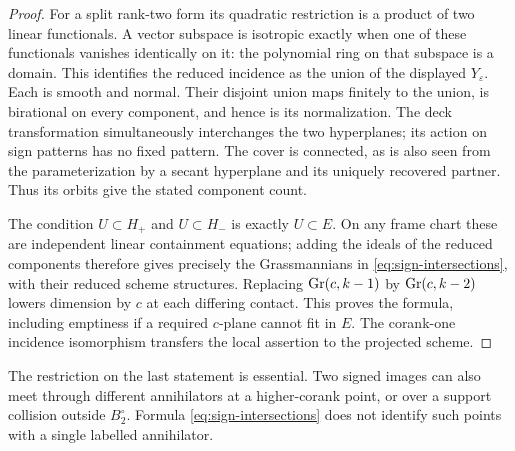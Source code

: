 \begin{proof}
For a split rank-two form its quadratic restriction is a product of two
linear functionals. A vector subspace is isotropic exactly when one of
these functionals vanishes identically on it: the polynomial ring on
that subspace is a domain. This identifies the reduced incidence as the
union of the displayed $Y_\varepsilon$. Each is smooth and normal.
Their disjoint union maps finitely to the union, is birational on every
component, and hence is its normalization. The deck transformation
simultaneously interchanges the two hyperplanes; its action on sign
patterns has no fixed pattern. The cover is connected, as is also seen
from the parameterization by a secant hyperplane and its uniquely
recovered partner. Thus its orbits give the stated component count.

The condition $U\subset H_+$ and $U\subset H_-$ is exactly
$U\subset E$. On any frame chart these are independent linear
containment equations; adding the ideals of the reduced components
therefore gives precisely the Grassmannians in
\eqref{eq:sign-intersections}, with their reduced scheme structures.
Replacing $\operatorname{Gr}(c,k-1)$ by $\operatorname{Gr}(c,k-2)$ lowers dimension by $c$ at
each differing contact. This proves the formula, including emptiness
if a required $c$-plane cannot fit in $E$. The corank-one incidence
isomorphism transfers the local assertion to the projected scheme.
\end{proof}
The restriction on the last statement is essential. Two signed images
can also meet through different annihilators at a higher-corank point,
or over a support collision outside $B_2^\circ$. Formula
\eqref{eq:sign-intersections} does not identify such points with a
single labelled annihilator.

